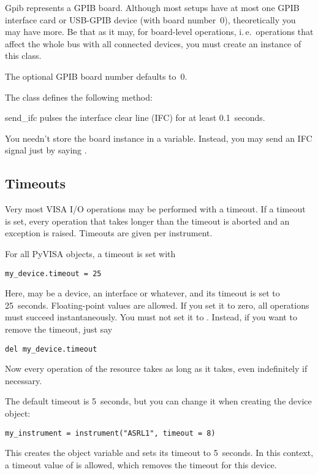 \documentclass{howto}
\begin{document}
\bigskip
\begin{classdesc}{Gpib}{}
  represents a GPIB board.  Although most setups have at most one GPIB
  interface card or USB-GPIB device (with board number~0), theoretically you
  may have more.  Be that as it may, for board-level operations, i.\,e.\
  operations that affect the whole bus with all connected devices, you must
  create an instance of this class.

  The optional GPIB board number  defaults to~0.
\end{classdesc}

The class  defines the following method:

\begin{methoddesc}{send_ifc}{}
  pulses the interface clear line (IFC) for at least 0.1~seconds.
\end{methoddesc}

\begin{notice}
You needn't store the board instance in a variable.  Instead, you may send an
IFC signal just by saying \samp{Gpib().send_ifc()}.
\end{notice}


\subsection{Timeouts}
\label{sec:timeouts}

Very most VISA I/O operations may be performed with a timeout.  If a timeout is
set, every operation that takes longer than the timeout is aborted and an
exception is raised.  Timeouts are given per instrument.

For all PyVISA objects, a timeout is set with
\begin{verbatim}
my_device.timeout = 25
\end{verbatim}
Here,  may be a device, an interface or whatever, and its
timeout is set to 25~seconds.  Floating-point values are allowed.  If you set
it to zero, all operations must succeed instantaneously.  You must not set it
to \code{None}.  Instead, if you want to remove the timeout, just say
\begin{verbatim}
del my_device.timeout
\end{verbatim}
Now every operation of the resource takes as long as it takes, even
indefinitely if necessary.

The default timeout is 5~seconds, but you can change it when creating the
device object:
\begin{verbatim}
my_instrument = instrument("ASRL1", timeout = 8)
\end{verbatim}
This creates the object variable  and sets its timeout to
5~seconds.  In this context, a timeout value of \code{None} is allowed, which
removes the timeout for this device.
\end{document}
